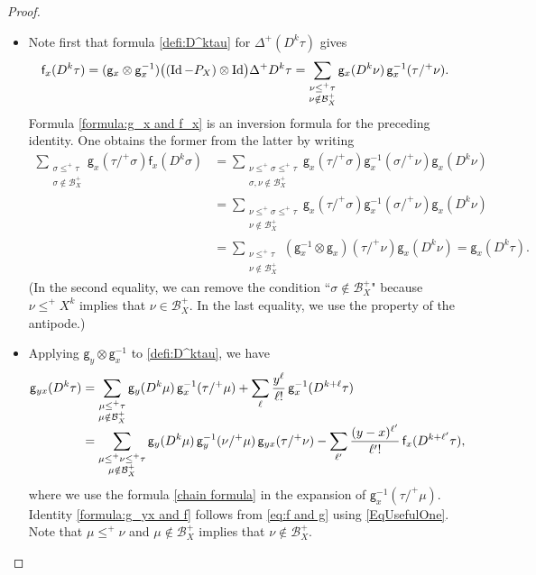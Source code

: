 \documentclass[10pt]{amsart}
\theoremstyle{plain}
\theoremstyle{definition}
\DeclareMathOperator{\iden}{Id}
\newcommand{\sff}{\mathsf{f}}
\newcommand{\sfg}{\mathsf{g}}
\newcommand{\mcB}{\mathcal{B}}
\begin{document}
\begin{proof}
\begin{itemize}
\item
Note first that formula \eqref{defi:D^ktau} for $\Delta^+(D^k\tau)$ gives
\begin{equation} \label{EqUsefulOne}
{\sff}_x(D^k\tau) = ({\sf g}_x\otimes {\sf g}_x^{-1})\bigl((\iden-P_X)\otimes\iden\bigr)\Delta^+D^k\tau = \sum_{\substack{\nu\leq^+\tau\\ \nu\notin\mcB_X^+}} {\sfg}_x(D^k\nu)\,{\sfg}_x^{-1}(\tau/^+\nu).
\end{equation}
Formula \eqref{formula:g_x and f_x} is an inversion formula for the preceding identity. One obtains the former from the latter by writing
\begin{align*}
\sum_{\substack{\sigma\leq^+\tau\\\sigma\notin\mcB_X^+}}\sfg_x(\tau/^+\sigma)\sff_x(D^k\sigma) &= \sum_{\substack{\nu\le^+\sigma\le^+\tau\\\sigma,\nu\notin\mcB_X^+}} \sfg_x(\tau/^+\sigma)\sfg_x^{-1}(\sigma/^+\nu)\sfg_x(D^k\nu) \\
&= \sum_{\substack{\nu\le^+\sigma\le^+\tau\\\nu\notin\mcB_X^+}} \sfg_x(\tau/^+\sigma)\sfg_x^{-1}(\sigma/^+\nu)\sfg_x(D^k\nu) \\
&= \sum_{\substack{\nu\le^+\tau\\\nu\notin\mcB_X^+}}(\sfg_x^{-1}\otimes\sfg_x)(\tau/^+\nu)\sfg_x(D^k\nu)= \sfg_x(D^k\tau).
\end{align*}
(In the second equality, we can remove the condition ``$\sigma\notin\mcB_X^+$" because $\nu\le^+X^k$ implies that $\nu\in\mcB_X^+$. In the last equality, we use the property of the antipode.)

\item
Applying $\sfg_y\otimes\sfg_x^{-1}$ to \eqref{defi:D^ktau}, we have
\begin{align}\label{eq:f and g}
\sfg_{yx}(D^k\tau)
&= \sum_{\substack{\mu\le^+\tau\\\mu\notin\mcB_X^+}} \sfg_y(D^k\mu)\,\sfg_x^{-1}(\tau/^+\mu) + \sum_\ell\frac{y^\ell}{\ell!}\,\sfg_x^{-1}(D^{k+\ell}\tau)\notag \\[-15pt] \\[-5pt]
&= \sum_{\substack{\mu\le^+\nu\le^+\tau\\\mu\notin\mcB_X^+}} \sfg_y(D^k\mu)\,\sfg_y^{-1}(\nu/^+\mu)\,\sfg_{yx}(\tau/^+\nu) - \sum_{\ell'}\frac{(y-x)^{\ell'}}{\ell'!}\,\sff_x(D^{k+\ell'}\tau),\notag
\end{align}
where we use the formula \eqref{chain formula} in the expansion of $\sfg_x^{-1}(\tau/^+\mu)$. Identity \eqref{formula:g_yx and f} follows from \eqref{eq:f and g} using \eqref{EqUsefulOne}. Note that $\mu\le^+\nu$ and $\mu\notin\mcB_X^+$ implies that $\nu\notin\mcB_X^+$.


\end{itemize}
\end{proof}
\end{document}
